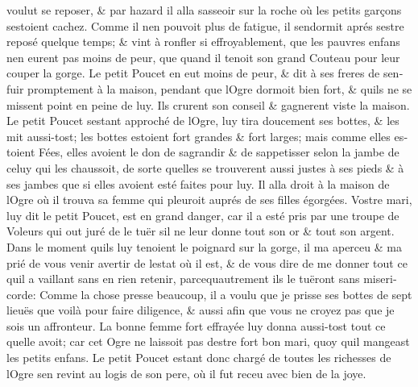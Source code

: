 \documentclass[14pt,a4paper]{memoir}
\begin{document}
{{\begin{otherlanguage}{french}
voulut se reposer, \& par hazard il alla s\textquotesingle asseoir sur
la roche où les petits garçons s\textquotesingle estoient cachez. Comme
il n\textquotesingle en pouvoit plus de fatigue, il
s\textquotesingle endormit aprés s\textquotesingle estre reposé quelque
temps; \& vint à ronfler si effroyablement, que les pauvres enfans
n\textquotesingle en eurent pas moins de peur, que quand il tenoit son
grand Couteau pour leur couper la gorge. Le petit Poucet en eut moins de
peur, \& dit à ses freres de s\textquotesingle enfuir promptement à la
maison, pendant que l\textquotesingle Ogre dormoit bien fort, \&
qu\textquotesingle ils ne se missent point en peine de luy. Ils crurent
son conseil \& gagnerent viste la maison. Le petit Poucet
s\textquotesingle estant approché de l\textquotesingle Ogre, luy tira
doucement ses bottes, \& les mit aussi-tost; les bottes estoient fort
grandes \& fort larges; mais comme elles estoient Fées, elles avoient le
don de s\textquotesingle agrandir \& de s\textquotesingle appetisser
selon la jambe de celuy qui les chaussoit, de sorte
qu\textquotesingle elles se trouverent aussi justes à ses pieds \& à ses
jambes que si elles avoient esté faites pour luy. Il alla droit à la
maison de l\textquotesingle Ogre où il trouva sa femme qui pleuroit
auprés de ses filles égorgées. Vostre mari, luy dit le petit Poucet, est
en grand danger, car il a esté pris par une troupe de Voleurs qui out
juré de le tuër s\textquotesingle il ne leur donne tout son or \& tout
son argent. Dans le moment qu\textquotesingle ils luy tenoient le
poignard sur la gorge, il m\textquotesingle a aperceu \&
m\textquotesingle a prié de vous venir avertir de
l\textquotesingle estat où il est, \& de vous dire de me donner tout ce
qu\textquotesingle il a vaillant sans en rien retenir,
parcequ\textquotesingle autrement ils le tuëront sans misericorde: Comme
la chose presse beaucoup, il a voulu que je prisse ses bottes de sept
lieuës que voilà pour faire diligence, \& aussi afin que vous ne croyez
pas que je sois un affronteur. La bonne femme fort effrayée luy donna
aussi-tost tout ce qu\textquotesingle elle avoit; car cet Ogre ne
laissoit pas d\textquotesingle estre fort bon mari, quoy
qu\textquotesingle il mangeast les petits enfans. Le petit Poucet estant
donc chargé de toutes les richesses de l\textquotesingle Ogre
s\textquotesingle en revint au logis de son pere, où il fut receu avec
bien de la joye.


\end{otherlanguage}}}
\end{document}
